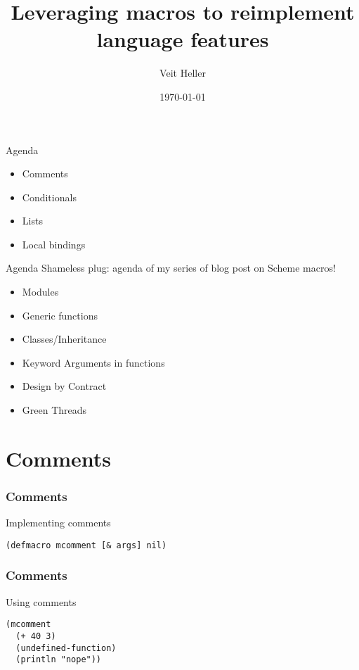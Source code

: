 \documentclass[aspectratio=169]{beamer}
\title{Leveraging macros to reimplement language features}
\date{\today}
\author{Veit Heller}
\institute{Clojure Meetup Berlin}
\begin{document}
  \maketitle
  \begin{frame}{Agenda}
    \begin{itemize}
      \item Comments
      \item Conditionals
      \item Lists
      \item Local bindings
    \end{itemize}
  \end{frame}
  \begin{frame}{Agenda}
    Shameless plug: agenda of my series of blog post on Scheme macros!
    \begin{itemize}
      \item Modules
      \item Generic functions
      \item Classes/Inheritance
      \item Keyword Arguments in functions
      \item Design by Contract
      \item Green Threads
    \end{itemize}
  \end{frame}
  \section{Comments}
  \begin{frame}[fragile]
    \frametitle{Comments}
    \begin{listing}[H]
      \caption{Implementing comments}
      \begin{verbatim}
(defmacro mcomment [& args] nil)
      \end{verbatim}
    \end{listing}
  \end{frame}
  \begin{frame}[fragile]
    \frametitle{Comments}
    \begin{listing}[H]
      \caption{Using comments}
      \begin{verbatim}
(mcomment
  (+ 40 3)
  (undefined-function)
  (println "nope"))
      \end{verbatim}
    \end{listing}
  \end{frame}
\end{document}
